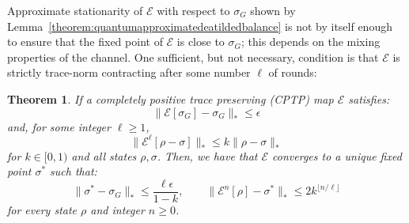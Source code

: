 \documentclass[aps,floatfix,10pt,amssymb,amsfont,amsmath,superscriptaddress,float,nofootinbib,longbibliography,nobalancelastpage,twocolumn]{revtex4-2}
\newtheorem{theorem}{Theorem}
\begin{document}
Approximate stationarity of $\mathcal{E}$ with respect to $\sigma_G$ shown by Lemma~\ref{theorem:quantumapproximatedeatildedbalance} is not by itself enough to ensure that the fixed point of $\mathcal{E}$ is close to $\sigma_G$; this depends on the mixing properties of the channel. One sufficient, but not necessary, condition is that $\mathcal{E}$ is strictly trace-norm contracting after some number $\ell$ of rounds:
 \begin{theorem}
     If a completely positive trace preserving (CPTP) map $\mathcal{E}$ satisfies:
     \begin{equation}
         \|\mathcal{E}[\sigma_G] - \sigma_G\|_* \leq \epsilon
     \end{equation}
     and, for some integer $\ell\geq1$,
 \begin{equation}
     \|\mathcal{E}^{\ell}[\rho-\sigma]\|_* \leq k\|\rho-\sigma\|_*
     \label{eq:contraction}
 \end{equation}
for $k \in [0,1)$ and all states $\rho, \sigma$. Then, we have that $\mathcal{E}$ converges to a unique fixed point $\sigma^*$ such that:
 \begin{equation}
     \| \sigma^* -\sigma_G\|_* \leq \frac{\ell\epsilon}{1-k},
     \qquad
     \|\mathcal{E}^n[\rho] -\sigma^*\|_* \leq 2k^{\lfloor n/\ell\rfloor}
 \end{equation}
 for every state $\rho$ and integer $n\geq0$.
 \label{theorem:error_bound}
 \end{theorem}
\end{document}
